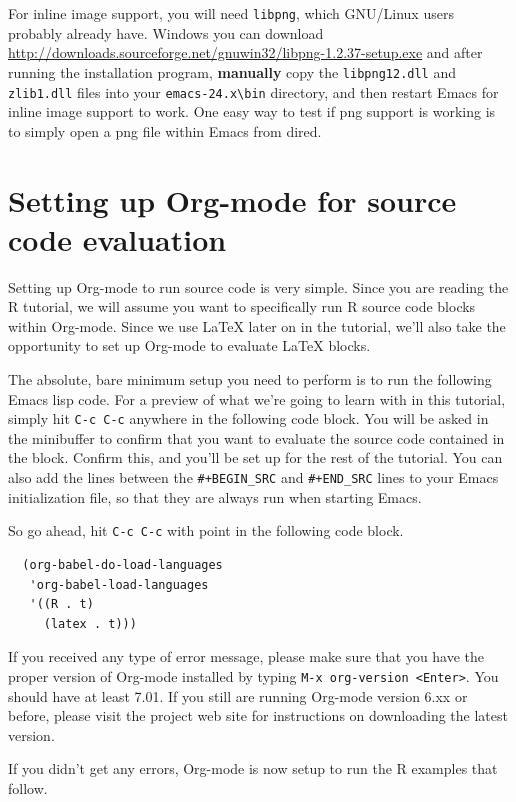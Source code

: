 \documentclass[11pt]{article}
\begin{document}
For inline image support, you will need \texttt{libpng}, which GNU/Linux
users probably already have.  Windows you can download
\url{http://downloads.sourceforge.net/gnuwin32/libpng-1.2.37-setup.exe} and
after running the installation program, \textbf{manually} copy the
\texttt{libpng12.dll} and \texttt{zlib1.dll} files into your \texttt{emacs-24.x\textbackslash{}bin}
directory, and then restart Emacs for inline image support to
work. One easy way to test if png support is working is to simply open
a png file within Emacs from dired.
\section*{Setting up Org-mode for source code evaluation}
\label{sec-2}

Setting up Org-mode to run source code is very simple. Since you are
reading the R tutorial, we will assume you want to specifically run R
source code blocks within Org-mode. Since we use \LaTeX{} later on in the
tutorial, we'll also take the opportunity to set up Org-mode to
evaluate \LaTeX{} blocks.

The absolute, bare minimum setup you need to perform is to run the
following Emacs lisp code. For a preview of what we're going to learn
with in this tutorial, simply hit \texttt{C-c C-c} anywhere in the following
code block. You will be asked in the minibuffer to confirm that you
want to evaluate the source code contained in the block. Confirm this,
and you'll be set up for the rest of the tutorial. You can also add
the lines between the \texttt{\#+BEGIN\_SRC} and \texttt{\#+END\_SRC} lines to your
Emacs initialization file, so that they are always run when starting
Emacs.

So go ahead, hit \texttt{C-c C-c} with point in the following code block.

\begin{verbatim}
  (org-babel-do-load-languages
   'org-babel-load-languages
   '((R . t)
     (latex . t)))
\end{verbatim}

If you received any type of error message, please make sure that you
have the proper version of Org-mode installed by typing \texttt{M-x
org-version <Enter>}. You should have at least 7.01. If you still are
running Org-mode version 6.xx or before, please visit the project web
site for instructions on downloading the latest version.

If you didn't get any errors, Org-mode is now setup to run the R
examples that follow.
\end{document}
